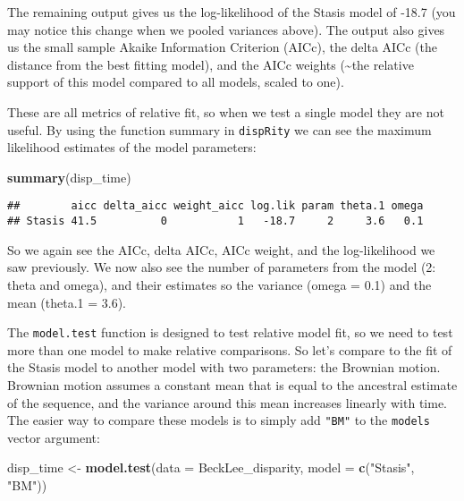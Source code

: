 \documentclass[
]{book}
\newenvironment{Shaded}{\begin{snugshade}}{\end{snugshade}}
\newcommand{\DataTypeTok}[1]{\textcolor[rgb]{0.13,0.29,0.53}{#1}}
\newcommand{\KeywordTok}[1]{\textcolor[rgb]{0.13,0.29,0.53}{\textbf{#1}}}
\newcommand{\NormalTok}[1]{#1}
\newcommand{\StringTok}[1]{\textcolor[rgb]{0.31,0.60,0.02}{#1}}
\begin{document}
The remaining output gives us the log-likelihood of the Stasis model of -18.7 (you may notice this change when we pooled variances above).
The output also gives us the small sample Akaike Information Criterion (AICc), the delta AICc (the distance from the best fitting model), and the AICc weights (\textasciitilde the relative support of this model compared to all models, scaled to one).

These are all metrics of relative fit, so when we test a single model they are not useful.
By using the function summary in \texttt{dispRity} we can see the maximum likelihood estimates of the model parameters:

\begin{Shaded}
\begin{Highlighting}[]
\KeywordTok{summary}\NormalTok{(disp\_time)}
\end{Highlighting}
\end{Shaded}

\begin{verbatim}
##        aicc delta_aicc weight_aicc log.lik param theta.1 omega
## Stasis 41.5          0           1   -18.7     2     3.6   0.1
\end{verbatim}

So we again see the AICc, delta AICc, AICc weight, and the log-likelihood we saw previously.
We now also see the number of parameters from the model (2: theta and omega), and their estimates so the variance (omega = 0.1) and the mean (theta.1 = 3.6).

The \texttt{model.test} function is designed to test relative model fit, so we need to test more than one model to make relative comparisons.
So let's compare to the fit of the Stasis model to another model with two parameters: the Brownian motion.
Brownian motion assumes a constant mean that is equal to the ancestral estimate of the sequence, and the variance around this mean increases linearly with time.
The easier way to compare these models is to simply add \texttt{"BM"} to the \texttt{models} vector argument:

\begin{Shaded}
\begin{Highlighting}[]
\NormalTok{disp\_time \textless{}{-}}\StringTok{ }\KeywordTok{model.test}\NormalTok{(}\DataTypeTok{data =}\NormalTok{ BeckLee\_disparity,}
                        \DataTypeTok{model =} \KeywordTok{c}\NormalTok{(}\StringTok{"Stasis"}\NormalTok{, }\StringTok{"BM"}\NormalTok{))}
\end{Highlighting}
\end{Shaded}
\end{document}

